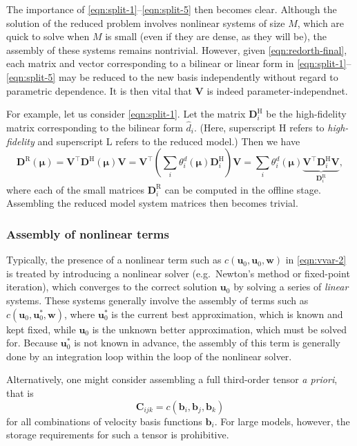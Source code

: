 \documentclass[onecolumn, twoside, a4paper, 11pt]{article}
\begin{document}
The importance of \eqref{eqn:split-1}--\eqref{eqn:split-5} then
becomes clear.  Although the solution of the reduced problem involves
nonlinear systems of size $M$, which are quick to solve when $M$ is
small (even if they are dense, as they will be), the assembly of these
systems remains nontrivial. However, given \eqref{eqn:redorth-final},
each matrix and vector corresponding to a bilinear or linear form in
\eqref{eqn:split-1}--\eqref{eqn:split-5} may be reduced to the new
basis independently without regard to parametric dependence. It is
then vital that $\bm V$ is indeed parameter-independnet.

For example, let us consider \eqref{eqn:split-1}. Let the matrix
$\bm D^\text{H}_i$ be the high-fidelity matrix corresponding to the bilinear
form $\hat{d}_i$. (Here, superscript H refers to \emph{high-fidelity} and
superscript L refers to the reduced model.) Then we have
\begin{equation}
  \bm D^\text{R}(\bm \mu)
  = \bm V^\intercal \bm D^\text{H}(\bm \mu) \bm V
  = \bm V^\intercal \left( \sum_i \theta^d_i(\bm \mu) \bm D^\text{H}_i \right) \bm V
  = \sum_i \theta^d_i(\bm \mu) \underbrace{\bm V^\intercal \bm D^\text{H}_i \bm V}_{\bm D^\text{R}_i},
\end{equation}
where each of the small matrices $\bm D^\text{R}_i$ can be computed in the
offline stage. Assembling the reduced model system matrices then becomes
trivial.

\subsubsection{Assembly of nonlinear terms}

Typically, the presence of a nonlinear term such as $c(\bm u_0, \bm u_0, \bm w)$
in \eqref{eqn:vvar-2} is treated by introducing a nonlinear solver
(e.g.~Newton's method or fixed-point iteration), which converges to the correct
solution $\bm u_0$ by solving a series of \emph{linear} systems. These systems
generally involve the assembly of terms such as $c(\bm u_0, \bm u_0^*, \bm w)$,
where $\bm u_0^*$ is the current best approximation, which is known and kept
fixed, while $\bm u_0$ is the unknown better approximation, which must be solved
for. Because $\bm u_0^*$ is not known in advance, the assembly of this term is
generally done by an integration loop within the loop of the nonlinear solver.

Alternatively, one might consider assembling a full third-order tensor
\emph{a priori}, that is
\begin{equation}
  \bm C_{ijk} = c(\bm b_i, \bm b_j, \bm b_k)
  \label{eqn:tensor}
\end{equation}
for all combinations of velocity basis functions $\bm b_i$. For large models,
however, the storage requirements for such a tensor is prohibitive.
\end{document}
